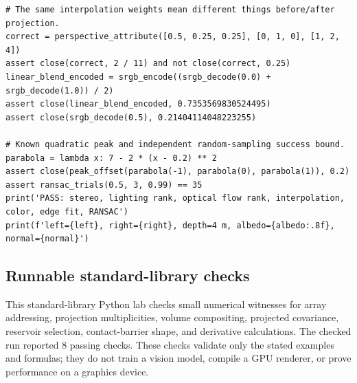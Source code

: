 \begin{verbatim}
# The same interpolation weights mean different things before/after projection.
correct = perspective_attribute([0.5, 0.25, 0.25], [0, 1, 0], [1, 2, 4])
assert close(correct, 2 / 11) and not close(correct, 0.25)
linear_blend_encoded = srgb_encode((srgb_decode(0.0) + srgb_decode(1.0)) / 2)
assert close(linear_blend_encoded, 0.7353569830524495)
assert close(srgb_decode(0.5), 0.21404114048223255)

# Known quadratic peak and independent random-sampling success bound.
parabola = lambda x: 7 - 2 * (x - 0.2) ** 2
assert close(peak_offset(parabola(-1), parabola(0), parabola(1)), 0.2)
assert ransac_trials(0.5, 3, 0.99) == 35
print('PASS: stereo, lighting rank, optical flow rank, interpolation, color, edge fit, RANSAC')
print(f'left={left}, right={right}, depth=4 m, albedo={albedo:.8f}, normal={normal}')
\end{verbatim}

\subsection{Runnable standard-library checks}\label{04-visual-computing-ii-ch034-runnable-standard-library-checks}

This standard-library Python lab checks small numerical witnesses for array addressing, projection multiplicities, volume compositing, projected covariance, reservoir selection, contact-barrier shape, and derivative calculations. The checked run reported 8 passing checks. These checks validate only the stated examples and formulas; they do not train a vision model, compile a GPU renderer, or prove performance on a graphics device.

